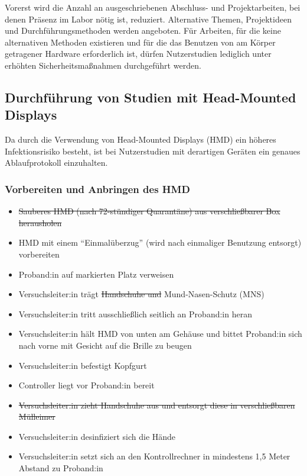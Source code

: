 Vorerst wird die Anzahl an ausgeschriebenen Abschluss- und Projektarbeiten, bei denen Präsenz im Labor nötig ist, reduziert. Alternative Themen, Projektideen und Durchführungsmethoden werden angeboten.
Für Arbeiten, für die keine alternativen Methoden existieren und für die das Benutzen von am Körper getragener Hardware erforderlich ist, dürfen Nutzerstudien lediglich unter erhöhten Sicherheitsmaßnahmen durchgeführt werden.

\subsection{Durchführung von Studien mit Head-Mounted Displays}\label{subsec:nutzerstudien_hmd}

Da durch die Verwendung von Head-Mounted Displays (HMD) ein höheres Infektionsrisiko besteht, ist bei Nutzerstudien mit derartigen Geräten ein genaues Ablaufprotokoll einzuhalten.

\subsubsection*{Vorbereiten und Anbringen des HMD}

{
\singlespacing
\begin{itemize}
    \item \sout{Sauberes HMD (nach 72-stündiger Quarantäne) aus verschließbarer Box herausholen}
    \item HMD mit einem “Einmalüberzug” (wird nach einmaliger Benutzung entsorgt) vorbereiten
    \item Proband:in auf markierten Platz verweisen 
    \item Versuchsleiter:in trägt \sout{Handschuhe und} Mund-Nasen-Schutz (MNS)
    \item Versuchsleiter:in tritt ausschließlich seitlich an Proband:in heran
    \item Versuchsleiter:in hält HMD von unten am Gehäuse und bittet Proband:in sich nach vorne mit Gesicht auf die Brille zu beugen 
    \item Versuchsleiter:in befestigt Kopfgurt 
    \item Controller liegt vor Proband:in bereit 
    \item \sout{Versuchsleiter:in zieht Handschuhe aus und entsorgt diese in verschließbaren Mülleimer}
    \item Versuchsleiter:in desinfiziert sich die Hände
    \item Versuchsleiter:in setzt sich an den Kontrollrechner in mindestens 1,5 Meter Abstand zu Proband:in
\end{itemize}
}

